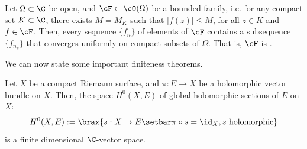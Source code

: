 \documentclass[11pt]{report}
\begin{document}
\begin{thm}
    Let $\Omega \subset \C$ be open, and $\cF \subset \cO(\Omega)$ be a bounded family, i.e. for any compact set $K \subset \C$, there exists $M=M_K$ such that $|f(z)| \leq M$, for all $z \in K$ and $f \in \cF$. Then, every sequence $\{f_n\}$ of elements of $\cF$ contains a subsequence $\{f_{n_k}\}$ that converges uniformly on compact subsets of $\Omega$. That is, $\cF$ is .
\end{thm}

We can now state some important finiteness theorems.

\begin{thm}
Let $X$ be a compact Riemann surface, and $\pi:E \to X$ be a holomorphic vector bundle on $X$. Then, the space $H^0(X,E)$ of global holomorphic sections of $E$ on $X$:
\[
H^0(X,E):= \brax{ s:X \to E \setbar \pi \circ s=\id_X, s\text{ holomorphic}}
\]
is a finite dimensional $\C$-vector space.
\end{thm}
\end{document}
